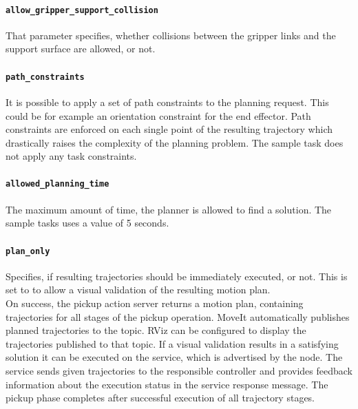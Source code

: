 \paragraph{\texttt{allow\_gripper\_support\_collision}} That parameter specifies, whether collisions between the gripper links and the support surface are allowed, or not.
\paragraph{\texttt{path\_constraints}} It is possible to apply a set of path constraints to the planning request. This could be for example an orientation constraint for the end effector. Path constraints are enforced on each single point of the resulting trajectory which drastically raises the complexity of the planning problem. The sample task does not apply any task constraints.
\paragraph{\texttt{allowed\_planning\_time}} The maximum amount of time, the planner is allowed to find a solution. The sample tasks uses a value of 5 seconds.
\paragraph{\texttt{plan\_only}} Specifies, if resulting trajectories should be immediately executed, or not. This is set to  to allow a visual validation of the resulting motion plan. \\

On success, the pickup action server returns a motion plan, containing trajectories for all stages of the pickup operation. MoveIt automatically publishes planned trajectories to the  topic. RViz can be configured to display the trajectories published to that topic. If a visual validation results in a satisfying solution it can be executed on the  service, which is advertised by the  node. The service sends given trajectories to the responsible controller and provides feedback information about the execution status in the service response message. The pickup phase completes after successful execution of all trajectory stages.

